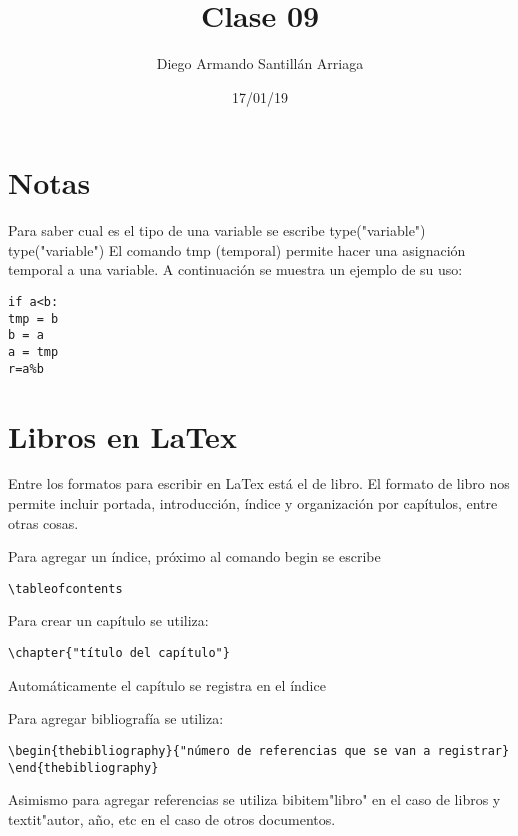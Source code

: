 \documentclass[letterpaper, 12pt, oneside]{article}%
\title{\Huge Clase 09}
\author{Diego Armando Santillán Arriaga}
\date{17/01/19}
\begin{document}
	\maketitle
	\newpage
\section*{Notas}
Para saber cual es el tipo de una variable se escribe type("variable")
type("variable")
El comando tmp (temporal) permite hacer una asignación temporal a una variable. A continuación se muestra un ejemplo de su uso:
\begin{verbatim}
if a<b:
tmp = b
b = a
a = tmp
r=a%b       
\end{verbatim}
 
\section{Libros en LaTex}
Entre los formatos para escribir en LaTex está el de libro. El formato de libro nos permite incluir portada, introducción, índice y organización por capítulos, entre otras cosas. 

Para agregar un índice, próximo al comando begin se escribe
\begin{verbatim}
\tableofcontents
\end{verbatim}

Para crear un capítulo se utiliza:
\begin{verbatim}
\chapter{"título del capítulo"}
\end{verbatim} 
Automáticamente el capítulo se registra en el índice

Para agregar bibliografía se utiliza:
\begin{verbatim}
\begin{thebibliography}{"número de referencias que se van a registrar}
\end{thebibliography}
\end{verbatim} 
Asimismo para agregar referencias se utiliza bibitem{"libro"} en el caso de libros y textit{"autor, año, etc} en el caso de otros documentos. 
\end{document}

